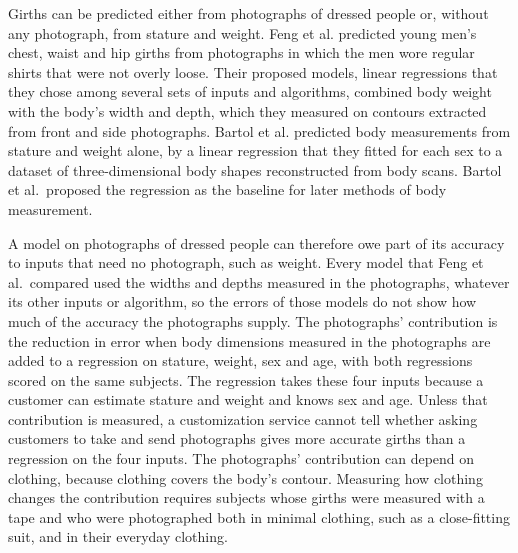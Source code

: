 \documentclass[12pt]{article}
\begin{document}
Girths can be predicted either from photographs of dressed people or, without any photograph, from stature and
weight. Feng et
al.\cite{feng2026} predicted young men's chest, waist and hip girths from photographs in which the men wore regular
shirts that were not overly loose. Their proposed models, linear regressions that they chose among several sets of inputs and
algorithms, combined body weight with the body's width and depth, which they measured on contours extracted from front
and side photographs. Bartol et al.\cite{bartol2022}
predicted body measurements from stature and weight alone, by a linear regression that they fitted for each sex to a
dataset of three-dimensional body shapes reconstructed from body scans.  Bartol et al.\ proposed the regression as the baseline for later methods of body measurement.

A model on photographs of dressed people can therefore owe part of its accuracy to inputs that need no photograph, such
as weight. Every model that Feng et al.\ compared used the widths and depths measured in the
photographs, whatever its other inputs or algorithm, so the errors of those models do not show how much of the accuracy the
photographs supply. The photographs' contribution is the reduction in error when body dimensions measured in the photographs are
added to a regression on stature, weight, sex and age, with both regressions scored on the same subjects. The regression takes these four inputs because a customer can estimate stature and
weight\cite{bartol2022} and knows sex and age. Unless
that contribution is measured, a customization service cannot tell whether asking customers to take and send
photographs gives more accurate girths than a regression on the four inputs. The photographs' contribution can depend on clothing, because clothing covers the body's contour.\cite{zhang2025} Measuring how clothing
changes the contribution requires subjects whose girths were measured with a tape and who were photographed both in
minimal clothing, such as a close-fitting suit, and in their everyday clothing.
\end{document}
